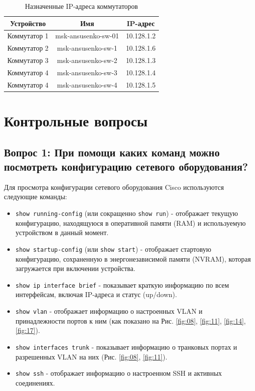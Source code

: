 \begin{table}[h]
    \centering
    \caption{Назначенные IP-адреса коммутаторов}
    \begin{tabular}{|c|c|c|}
        \hline
        \textbf{Устройство} & \textbf{Имя} & \textbf{IP-адрес} \\
        \hline
        Коммутатор 1 & msk-ansusenko-sw-01 & 10.128.1.2 \\
        \hline
        Коммутатор 2 & msk-ansusenko-sw-1 & 10.128.1.6 \\
        \hline
        Коммутатор 3 & msk-ansusenko-sw-2 & 10.128.1.3 \\
        \hline
        Коммутатор 4 & msk-ansusenko-sw-3 & 10.128.1.4 \\
        \hline
        Коммутатор 4 & msk-ansusenko-sw-4 & 10.128.1.5 \\
    \end{tabular}
    \label{tab:ip}
\end{table}

\section{Контрольные вопросы}

\subsection{Вопрос 1: При помощи каких команд можно посмотреть конфигурацию сетевого оборудования?}
Для просмотра конфигурации сетевого оборудования Cisco используются следующие команды:

\begin{itemize}
    \item \texttt{show running-config} (или сокращенно \texttt{show run}) - отображает текущую конфигурацию, находящуюся в оперативной памяти (RAM) и используемую устройством в данный момент.
    
    \item \texttt{show startup-config} (или \texttt{show start}) - отображает стартовую конфигурацию, сохраненную в энергонезависимой памяти (NVRAM), которая загружается при включении устройства.
    
    \item \texttt{show ip interface brief} - показывает краткую информацию по всем интерфейсам, включая IP-адреса и статус (up/down).
    
    \item \texttt{show vlan} - отображает информацию о настроенных VLAN и принадлежности портов к ним (как показано на Рис. \ref{fig:08}, \ref{fig:11}, \ref{fig:14}, \ref{fig:17}).
    
    \item \texttt{show interfaces trunk} - показывает информацию о транковых портах и разрешенных VLAN на них (Рис. \ref{fig:08}, \ref{fig:11}).
    
    \item \texttt{show ssh} - отображает информацию о настроенном SSH и активных соединениях.
\end{itemize}

